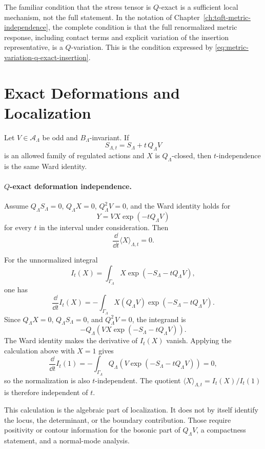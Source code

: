 The familiar condition that the stress tensor is \(Q\)-exact is a sufficient
local mechanism, not the full statement.  In the notation of
Chapter~\ref{ch:tqft-metric-independence}, the complete condition is that
the full renormalized metric response, including contact terms and explicit
variation of the insertion representative, is a \(Q\)-variation.  This is
the condition expressed by
\eqref{eq:metric-variation-q-exact-insertion}.

\section{Exact Deformations and Localization}

Let \(V\in\mathcal A_\Lambda\) be odd and \(B_\Lambda\)-invariant.  If
\begin{equation}
  S_{\Lambda,t}=S_\Lambda+t\,Q_\Lambda V
  \label{eq:q-exact-deformed-action}
\end{equation}
is an allowed family of regulated actions and \(X\) is
\(Q_\Lambda\)-closed, then \(t\)-independence is the same Ward identity.

\paragraph{\(Q\)-exact deformation independence.}
Assume \(Q_\Lambda S_\Lambda=0\), \(Q_\Lambda X=0\),
\(Q_\Lambda^2V=0\), and the Ward identity holds for
\[
  Y=V X\exp(-tQ_\Lambda V)
\]
for every \(t\) in the interval under consideration.  Then
\[
  \frac{\dd}{\dd t}\langle X\rangle_{\Lambda,t}=0 .
\]

For the unnormalized integral
\[
  I_t(X)=\int_{\Gamma_\Lambda}X\exp(-S_\Lambda-tQ_\Lambda V),
\]
one has
\[
  \frac{\dd}{\dd t}I_t(X)
  =
  -\int_{\Gamma_\Lambda}X(Q_\Lambda V)\exp(-S_\Lambda-tQ_\Lambda V).
\]
Since \(Q_\Lambda X=0\), \(Q_\Lambda S_\Lambda=0\), and
\(Q_\Lambda^2V=0\), the integrand is
\[
  -Q_\Lambda\!\left(VX\exp(-S_\Lambda-tQ_\Lambda V)\right).
\]
The Ward identity makes the derivative of \(I_t(X)\) vanish.  Applying the
calculation above with \(X=1\) gives
\[
  \frac{\dd}{\dd t}I_t(1)
  =
  -\int_{\Gamma_\Lambda}
  Q_\Lambda\!\left(V\exp(-S_\Lambda-tQ_\Lambda V)\right)
  =
  0,
\]
so the normalization is also \(t\)-independent.  The quotient
\(\langle X\rangle_{\Lambda,t}=I_t(X)/I_t(1)\) is therefore independent of
\(t\).

This calculation is the algebraic part of localization.  It does not by
itself identify the locus, the determinant, or the boundary contribution.
Those require positivity or contour information for the bosonic part of
\(Q_\Lambda V\), a compactness statement, and a normal-mode analysis.


